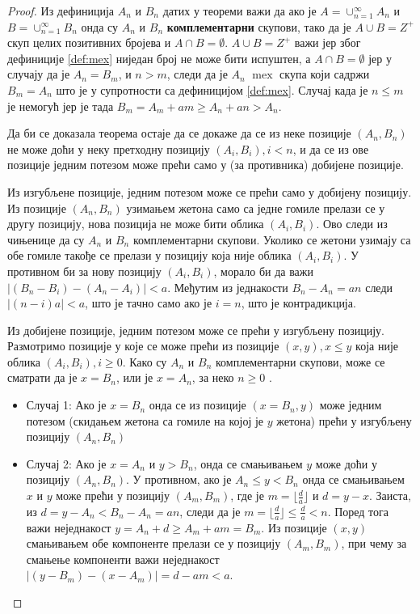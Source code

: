 \documentclass[a4paper]{article}
\DeclareMathOperator{\mex}{mex}
\begin{document}
\begin{proof}
	
	Из дефиниција $ A_{n} $ и $ B_{n} $ датих у теореми важи да ако је $ A = \cup_{n=1}^{\infty} A_{n} $ и  $ B = \cup_{n=1}^{\infty} B_{n} $ онда су $ A_{n} $ и $ B_{n} $ \textbf{комплементарни} скупови, тако да је $ A \cup B = Z^{+} $ скуп целих позитивних бројева  и $ A \cap B = \emptyset $. 
	$ A \cup B = Z^{+} $ важи јер због дефиниције \ref{def:mex} ниједан број не може бити испуштен, а $ A \cap B = \emptyset $ јер у случају да је $ A_{n} = B_{m} $, и $ n > m $, следи да је $ A_{n} $ $ \mex $ скупа који садржи $ B_{m} = A_{n} $ што је у супротности са дефиницијом \ref{def:mex}. Случај када је $ n \leq m $ је немогућ јер је тада $ B_{m} = A_{m} + am \geq  A_{n} + an > A_{n} $. 
	
	Да би се доказала теорема остаје да се докаже да се из неке позиције $ (A_{n}, B_{n}) $ не може доћи у неку претходну позицију $ (A_{i}, B_{i}), i < n $, и да се из ове позиције једним потезом може прећи само у (за противника) добијене позиције.
	
	Из изгубљене позиције, једним потезом може се прећи само у добијену позицију. Из позиције $ (A_{n}, B_{n}) $ узимањем жетона само са једне гомиле прелази се у другу позицију, нова позиција не може бити облика $ (A_{i}, B_{i}) $. Ово следи из чињенице да су  $ A_{n} $ и $ B_{n} $ комплементарни скупови. Уколико се жетони узимају са обе гомиле такође се прелази у позицију која није облика $ (A_{i}, B_{i}) $. У противном би за нову позицију $ (A_{i}, B_{i}) $, морало би да важи $ |(B_{n} - B_{i}) - (A_{n}-A_{i})| < a $. Међутим из једнакости $ B_{n} - A_{n} = an $ следи $ |(n-i)a| < a $, што је тачно само ако је $ i = n $, што је контрадикција. 
	
	Из добијене позиције, једним потезом може се прећи у изгубљену позицију.
	Размотримо позиције у које се може прећи из позиције $ (x, y), x \le y $ која није облика $ (A_{i}, B_{i}), i \ge 0 $. Како су $ A_{n} $ и $ B_{n} $ комплементарни скупови, може се сматрати да је $ x = B_{n} $, или је $ x = A_{n} $, за неко $ n \ge 0 $ .
	\begin{itemize}
		\item \label{case:slucaj1} Случај 1: Ако је $ x = B_{n} $ онда се из позиције $ (x = B_{n}, y) $ може једним потезом (скидањем жетона са гомиле на којој је $ y $ жетона) прећи у изгубљену позицију $ (A_{n}, B_{n}) $ 
		\item \label{case:slucaj2} Случај 2: Ако је $ x = A_{n} $ и $ y > B_{n} $, онда се смањивањем $ y $ може доћи у позицију $ (A_{n}, B_{n}) $. У противном, ако је $ A_{n} \le y < B_{n} $ онда се смањивањем $ x $ и $ y $ може прећи у позицију $ (A_{m}, B_{m}) $, где је $ m = \lfloor \frac{d}{a} \rfloor $ и $ d = y - x $. Заиста, из $ d = y - A_{n} < B_{n} - A_{n} = an $, следи да је  $ m = \lfloor \frac{d}{a} \rfloor \le \frac{d}{a} < n $. Поред тога важи неједнакост $ y = A_{n} + d \ge A_{m} + am = B_m $. Из позиције $ (x, y) $ смањивањем обе компоненте прелази се у позицију $ (A_{m}, B_{m}) $, при чему за смањење компоненти важи неједнакост $ |(y - B_{m}) - (x - A_{m})| = d - am < a $.
	\end{itemize}
	
\end{proof}
\end{document}
